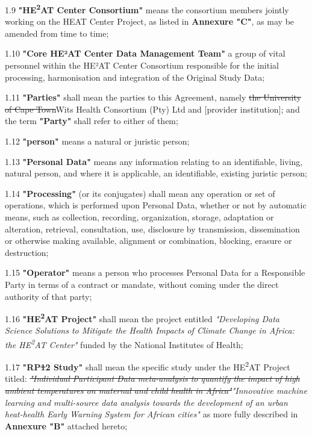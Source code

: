 \documentclass[12pt,letterpaper]{article}
\newcommand{\deleted}[1]{\textcolor{deletecolor}{\sout{#1}}}
\newcommand{\added}[1]{\textcolor{addcolor}{#1}}
\begin{document}
1.9 \textbf{"HE\textsuperscript{2}AT Center Consortium"} means the consortium members jointly working on the HEAT Center Project, as listed in \textbf{Annexure "C"}, as may be amended from time to time;

1.10 \textbf{"Core HE²AT Center Data Management Team"} a group of \added{vital} personnel within the HE²AT Center Consortium responsible for the initial processing, harmonisation and integration of the Original Study Data;

1.11 \textbf{"Parties"} shall mean the parties to this Agreement, namely \deleted{the University of Cape Town}\added{Wits Health Consortium (Pty) Ltd} and [provider institution]; and the term \textbf{"Party"} shall refer to either of them;

1.12 \textbf{"person"} means a natural or juristic person;

1.13 \textbf{"Personal Data"} means any information relating to an identifiable, living, natural person, and where it is applicable, an identifiable, existing juristic person;

1.14 \textbf{"Processing"} (or its conjugates) shall mean any operation or set of operations, which is performed upon Personal Data, whether or not by automatic means, such as collection, recording, organization, storage, adaptation or alteration, retrieval, consultation, use, disclosure by transmission, dissemination or otherwise making available, alignment or combination, blocking, erasure or destruction;

1.15 \textbf{"Operator"} means a person who processes Personal Data for a Responsible Party in terms of a contract or mandate, without coming under the direct authority of that party;

1.16 \textbf{"HE\textsuperscript{2}AT Project"} shall mean the project entitled \textit{"Developing Data Science Solutions to Mitigate the Health Impacts of Climate Change in Africa: the HE\textsuperscript{2}AT Center"} funded by the National Institutes of Health;

1.17 \textbf{"RP\deleted{1}\added{2} Study"} shall mean the specific study under the HE\textsuperscript{2}AT Project titled: \deleted{\textit{"Individual Participant Data meta-analysis to quantify the impact of high ambient temperatures on maternal and child health in Africa"}}\added{\textit{"Innovative machine learning and multi-source data analysis towards the development of an urban heat-health Early Warning System for African cities"}} as more fully described in \textbf{Annexure "B"} attached hereto;
\end{document}
